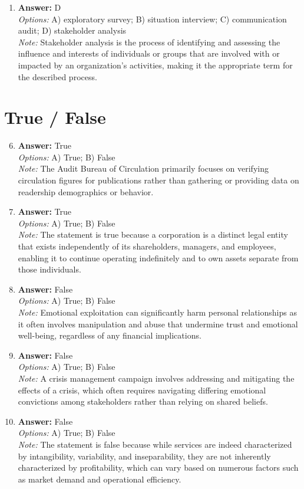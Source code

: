 \documentclass[12pt]{article}
\begin{document}
\begin{enumerate}[label=\arabic*.]
\item \textbf{Answer:} D
\\ \textit{Options:} A) exploratory survey; B) situation interview; C) communication audit; D) stakeholder analysis
\\ \textit{Note:} Stakeholder analysis is the process of identifying and assessing the influence and interests of individuals or groups that are involved with or impacted by an organization's activities, making it the appropriate term for the described process.
\end{enumerate}

\section*{True / False}
\begin{enumerate}[label=\arabic*.]
\setcounter{enumi}{5}
\item \textbf{Answer:} True
\\ \textit{Options:} A) True; B) False
\\ \textit{Note:} The Audit Bureau of Circulation primarily focuses on verifying circulation figures for publications rather than gathering or providing data on readership demographics or behavior.
\item \textbf{Answer:} True
\\ \textit{Options:} A) True; B) False
\\ \textit{Note:} The statement is true because a corporation is a distinct legal entity that exists independently of its shareholders, managers, and employees, enabling it to continue operating indefinitely and to own assets separate from those individuals.
\item \textbf{Answer:} False
\\ \textit{Options:} A) True; B) False
\\ \textit{Note:} Emotional exploitation can significantly harm personal relationships as it often involves manipulation and abuse that undermine trust and emotional well-being, regardless of any financial implications.
\item \textbf{Answer:} False
\\ \textit{Options:} A) True; B) False
\\ \textit{Note:} A crisis management campaign involves addressing and mitigating the effects of a crisis, which often requires navigating differing emotional convictions among stakeholders rather than relying on shared beliefs.
\item \textbf{Answer:} False
\\ \textit{Options:} A) True; B) False
\\ \textit{Note:} The statement is false because while services are indeed characterized by intangibility, variability, and inseparability, they are not inherently characterized by profitability, which can vary based on numerous factors such as market demand and operational efficiency.
\end{enumerate}
\end{document}
